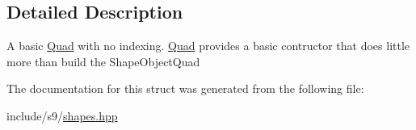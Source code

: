 \subsection{\-Detailed \-Description}
\-A basic \hyperlink{classs9_1_1Quad}{\-Quad} with no indexing. \hyperlink{classs9_1_1Quad}{\-Quad} provides a basic contructor that does little more than build the \-Shape\-Object\-Quad 

\-The documentation for this struct was generated from the following file\-:\begin{DoxyCompactItemize}
\item 
include/s9/\hyperlink{shapes_8hpp}{shapes.\-hpp}\end{DoxyCompactItemize}
